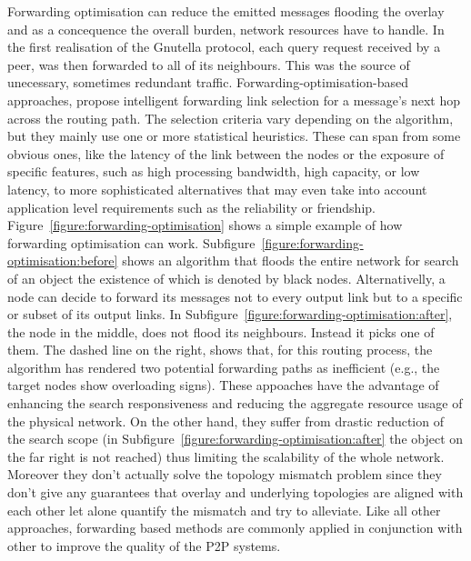 
Forwarding optimisation can reduce the emitted messages flooding the overlay and
as a concequence the overall burden, network resources have to handle. In the
first realisation of the Gnutella protocol, each query request received by a
peer, was then forwarded to all of its neighbours. This was the source of
unecessary, sometimes redundant traffic. Forwarding-optimisation-based
approaches, propose intelligent forwarding link selection for a message's next
hop across the routing path. The selection criteria vary depending on the
algorithm, but they mainly use one or more statistical heuristics. These can
span from some obvious ones, like the latency of the link between the nodes or
the exposure of specific features, such as high processing bandwidth, high
capacity, or low latency, to more sophisticated alternatives that may even take
into account application level requirements such as the reliability or
friendship. Figure~\ref{figure:forwarding-optimisation} shows a simple example
of how forwarding optimisation can work.
Subfigure~\ref{figure:forwarding-optimisation:before} shows an algorithm that
floods the entire network for search of an object the existence of which is
denoted by black nodes. Alternativelly, a node can decide to forward its
messages not to every output link but to a specific or subset of its output
links. In
Subfigure~\ref{figure:forwarding-optimisation:after}, the node in the middle,
does not flood its neighbours. Instead it picks one of them. The dashed line on
the right, shows that, for this routing process, the algorithm has rendered two
potential forwarding paths as inefficient (e.g., the target nodes show
overloading signs). These appoaches have the advantage of enhancing the search
responsiveness and reducing the aggregate resource usage of the physical
network. On the other hand, they suffer from drastic reduction of the search
scope (in Subfigure~\ref{figure:forwarding-optimisation:after} the object on the
far right is not reached) thus limiting the scalability of the whole network.
Moreover they don't actually solve the topology mismatch problem since they
don't give any guarantees that overlay and underlying topologies are aligned
with each other let alone quantify the mismatch and try to alleviate. Like all
other approaches, forwarding based methods are commonly applied in conjunction
with other to improve the quality of the P2P systems.

